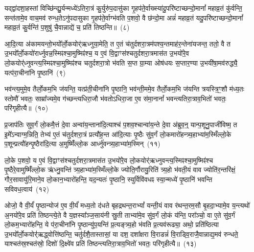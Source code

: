 यद्द्वा॑दशा॒हस्तां विच्छि॑न्द्यु॒र्यन्मध्ये॑\-ऽतिरा॒त्रं कु॒र्युरु॑प॒दासु॑का गृ॒हप॑ते॒र्वाख्स्या॑दु॒परि॑ष्टाच्छन्दो॒मानां᳚ महाव्र॒तं कु॑र्वन्ति॒ सन्त॑तामे॒व वाच॒मव॑ रुन्ध॒ते\-ऽनु॑पदासुका गृ॒हप॑ते॒र्वाग्भ॑वति प॒शवो॒ वै छ॑न्दो॒मा अन्नं॑ महाव्र॒तं यदु॒परि॑ष्टाच्छन्दो॒मानां᳚ महाव्र॒तं कु॒र्वन्ति॑ प॒शुषु॑ चै॒वान्नाद्ये॑ च॒ प्रति॑ तिष्ठन्ति॥~(८)

{\anuvakamend[{वित॑ता॒ त्रिच॑त्वारिꣳशच्च}]}%

आ॒दि॒त्या अ॑कामयन्तो॒भयो᳚र्लो॒कयोर्॑ऋध्नुया॒मेति॒ त ए॒तं च॑तुर्दशरा॒त्रम॑पश्य॒न्तमाह॑र॒न्तेना॑यजन्त॒ ततो॒ वै त उ॒भयो᳚र्लो॒कयो॑रार्ध्नुवन्न॒स्मिꣴश्चा॒मुष्मिꣴ॑श्च॒ य ए॒वं वि॒द्वाꣳस॑श्चतुर्दशरा॒त्रमास॑त उ॒भयो॑रे॒व लो॒कयोर्॑\mbox{}॑ध्नुवन्त्य॒\-स्मिꣴश्चा॒मुष्मिꣴ॑श्च चतुर्दशरा॒त्रो भ॑वति स॒प्त ग्रा॒म्या ओष॑धयः स॒प्तार॒ण्या उ॒भयी॑षा॒मव॑रुद्ध्यै॒ यत्प॑रा॒चीना॑नि पृ॒ष्ठानि॑~(९)

भव॑न्त्य॒मुमे॒व तैर्लो॒कम॒भि ज॑यन्ति॒ यत्प्र॑ती॒चीना॑नि पृ॒ष्ठानि॒ भव॑न्ती॒ममे॒व तैर्लो॒कम॒भि ज॑यन्ति त्रयस्त्रि॒ꣳ॒शौ म॑ध्य॒तः स्तोमौ॑ भवतः॒ साम्रा᳚ज्यमे॒व ग॑च्छन्त्यधिरा॒जौ भ॑वतो\-ऽधिरा॒जा ए॒व स॑मा॒नानां᳚ भवन्त्यतिरा॒त्राव॒भितो॑ भवतः॒ परि॑गृहीत्यै॥~(१०)

{\anuvakamend[{पृ॒ष्ठानि॒ चतु॑स्त्रिꣳशच्च}]}%

प्र॒जा\-प॑तिः सुव॒र्गं लो॒कमै॒त्तं दे॒वा अन्वा॑य॒न्ताना॑दि॒त्याश्च॑ प॒शव॒श्चान्वा॑य॒न्ते दे॒वा अ॑ब्रुव॒न्॒ यान्प॒शूनु॒पाजी॑विष्म॒ त इ॒मे᳚\-ऽन्वाग्म॒न्निति॒ तेभ्य॑ ए॒तं च॑तुर्दशरा॒त्रं प्रत्यौ॑ह॒न्त आ॑दि॒त्याः पृ॒ष्ठैः सु॑व॒र्गं लो॒कमारो॑हन्त्र्य॒हाभ्या॑म॒स्मिँल्लो॒के प॒शून्प्रत्यौ॑हन्पृ॒ष्ठैरा॑दि॒त्या अ॒मुष्मिँ॑ल्लो॒क आर्ध्नु॑वन्त्र्य॒हाभ्या॑म॒स्मिन्~(११)

लो॒के प॒शवो॒ य ए॒वं वि॒द्वाꣳस॑श्चतुर्दशरा॒त्रमास॑त उ॒भयो॑रे॒व लो॒कयोर्॑ऋध्नुवन्त्य॒स्मिꣴश्चा॒मुष्मिꣴ॑श्च पृ॒ष्ठैरे॒वामुष्मिँ॑ल्लो॒क ऋ॑ध्नु॒वन्ति॑ त्र्य॒हाभ्या॑म॒स्मिँल्लो॒के ज्योति॒र्गौरायु॒रिति॑ त्र्य॒हो भ॑वती॒यं वाव ज्योति॑र॒न्तरि॑क्षं॒ गौर॒सावायु॑रि॒माने॒व लो॒कान॒भ्यारो॑हन्ति॒ यद॒न्यतः॑ पृ॒ष्ठानि॒ स्युर्विवि॑वधꣴ स्या॒न्मध्ये॑ पृ॒ष्ठानि॑ भवन्ति सविवध॒त्वाय॑~(१२)

ओजो॒ वै वी॒र्यं॑ पृ॒ष्ठान्योज॑ ए॒व वी॒र्यं॑ मध्य॒तो द॑धते बृहद्रथन्त॒रा\-भ्यां᳚ यन्ती॒यं वाव र॑थन्त॒रम॒सौ बृ॒हदा॒भ्यामे॒व य॒न्त्यथो॑ अ॒नयो॑रे॒व प्रति॑ तिष्ठन्त्ये॒ते वै य॒ज्ञस्या᳚ञ्ज॒साय॑नी स्रु॒ती ताभ्या॑मे॒व सु॑व॒र्गं लो॒कं य॑न्ति॒ परा᳚ञ्चो॒ वा ए॒ते सु॑व॒र्गं लो॒कम॒भ्यारो॑हन्ति॒ ये प॑रा॒चीना॑नि पृ॒ष्ठान्यु॑प॒यन्ति॑ प्र॒त्यङ्त्र्य॒हो भ॑वति प्र॒त्यव॑रूढ्या॒ अथो॒ प्रति॑ष्ठित्या उ॒भयो᳚र्लो॒कयोर्॑\mbox{}॑ऋद्ध्वोत्ति॑ष्ठन्ति॒ चतु॑र्दशै॒तास्तासां॒ या दश॒ दशा᳚क्षरा वि॒राडन्नं॑ वि॒राड्वि॒राजै॒वान्नाद्य॒मव॑ रुन्धते॒ याश्चत॑स्र॒श्चत॑स्रो॒ दिशो॑ दि॒क्ष्वे॑व प्रति॑ तिष्ठन्त्यतिरा॒त्राव॒भितो॑ भवतः॒ परि॑गृहीत्यै॥~(१३)

